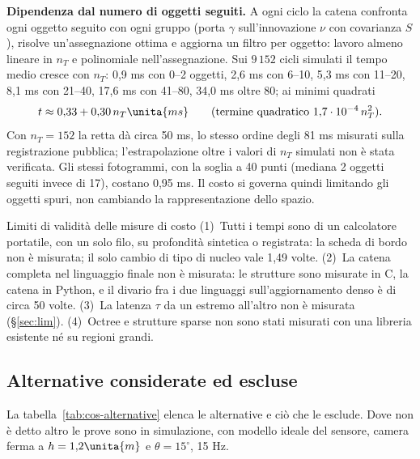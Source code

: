 \textbf{Dipendenza dal numero di oggetti seguiti.} A ogni ciclo la catena confronta ogni oggetto seguito con ogni gruppo (porta $\gamma$ sull'innovazione $\nu$ con covarianza $S$), risolve un'assegnazione ottima \cite{kuhn1955} e aggiorna un filtro per oggetto: lavoro almeno lineare in $n_T$ e polinomiale nell'assegnazione. Sui $9\,152$ cicli simulati il tempo medio cresce con $n_T$: 0,9 ms con 0--2 oggetti, 2,6 ms con 6--10, 5,3 ms con 11--20, 8,1 ms con 21--40, 17,6 ms con 41--80, 34,0 ms oltre 80; ai minimi quadrati
\begin{equation}\label{eq:cos-retta}
t\approx 0{,}33+0{,}30\,n_T\unita{ms}\qquad(\text{termine quadratico } 1{,}7\cdot10^{-4}\,n_T^2).
\end{equation}
Con $n_T=152$ la retta dà circa 50 ms, lo stesso ordine degli 81 ms misurati sulla registrazione pubblica; l'estrapolazione oltre i valori di $n_T$ simulati non è stata verificata. Gli stessi fotogrammi, con la soglia a 40 punti (mediana 2 oggetti seguiti invece di 17), costano 0,95 ms. Il costo si governa quindi limitando gli oggetti spuri, non cambiando la rappresentazione dello spazio. 

\begin{riquadro}{Limiti di validità delle misure di costo}
(1)~Tutti i tempi sono di un calcolatore portatile, con un solo filo, su profondità sintetica o registrata: la scheda di bordo non è misurata; il solo cambio di tipo di nucleo vale 1,49 volte. (2)~La catena completa nel linguaggio finale non è misurata: le strutture sono misurate in C, la catena in Python, e il divario fra i due linguaggi sull'aggiornamento denso è di circa 50 volte. (3)~La latenza $\tau$ da un estremo all'altro non è misurata (\S\ref{sec:lim}). (4)~Octree e strutture sparse non sono stati misurati con una libreria esistente né su regioni grandi. 
\end{riquadro}

\subsection{Alternative considerate ed escluse}\label{sec:cos-alternative}

La tabella~\ref{tab:cos-alternative} elenca le alternative e ciò che le esclude. Dove non è detto altro le prove sono in simulazione, con modello ideale del sensore, camera ferma a $h=1{,}2\unita{m}$ e $\theta=15^\circ$, 15 Hz.

